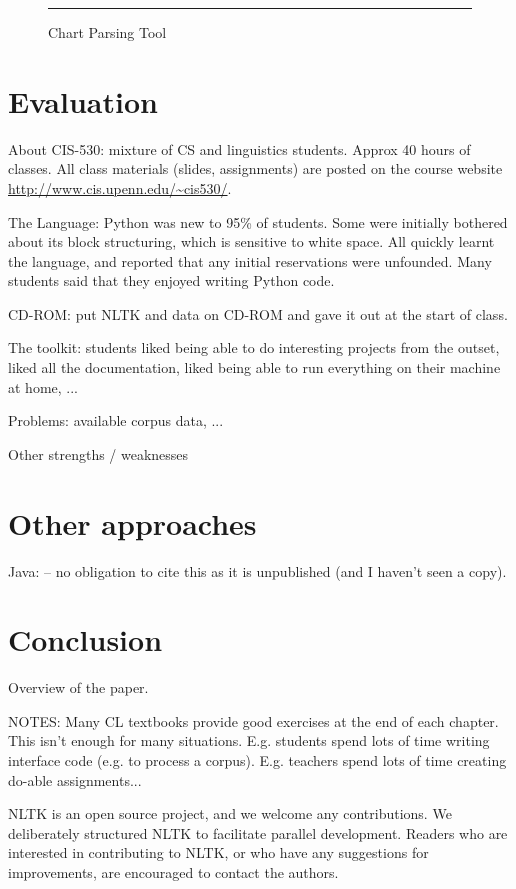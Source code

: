 \documentclass[11pt]{article}
\begin{document}
\begin{figure}
\caption{Chart Parsing Tool}\label{fig:chartparse}
\vspace*{2ex}\hrule
\end{figure}

\section{Evaluation}

About CIS-530: mixture of CS and linguistics students.
Approx 40 hours of classes.  All class materials (slides,
assignments) are posted on the course website
\url{http://www.cis.upenn.edu/~cis530/}.

The Language: Python was new to 95\% of students.  Some were initially
bothered about its block structuring, which is sensitive to white
space.  All quickly learnt the language, and reported that any initial
reservations were unfounded.  Many students said that they enjoyed
writing Python code.

CD-ROM: put NLTK and data on CD-ROM and gave it out at the start of class.

The toolkit: students liked being able to do interesting projects from
the outset, liked all the documentation, liked being able to run
everything on their machine at home, ...

Problems: available corpus data, ...

Other strengths / weaknesses

\section{Other approaches}

Java: \cite{Hammond02}
-- no obligation to cite this as it is unpublished
(and I haven't seen a copy).

\section{Conclusion}

Overview of the paper.

NOTES: Many CL textbooks provide good exercises at the end of each
chapter.  This isn't enough for many situations.  E.g. students spend
lots of time writing interface code (e.g. to process a corpus).
E.g. teachers spend lots of time creating do-able assignments...

NLTK is an open source project, and we welcome any contributions.  We
deliberately structured NLTK to facilitate parallel development.
Readers who are interested in contributing to NLTK, or who have any
suggestions for improvements, are encouraged to contact the authors.



\end{document}
